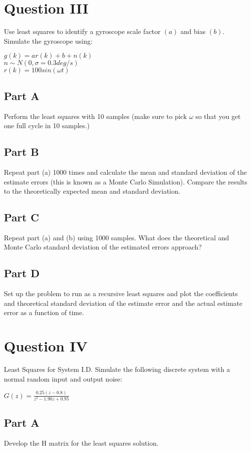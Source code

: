 \documentclass{article}
\begin{document}
\section*{Question III}
Use least squares to identify a gyroscope scale factor $(a)$ and bias $(b)$.  Simulate the gyroscope using:
\begin{center}
    $g(k) = ar(k) + b + n(k)$\\
    $n\sim N(0, \sigma = 0.3 deg/s)$\\
    $r(k) = 100sin(\omega t)$
\end{center}
\subsection*{Part A}
Perform the least squares with 10 samples (make sure to pick $\omega$ so that you get one full cycle in 10 samples.)
\subsection*{Part B}
Repeat part (a) 1000 times and calculate the mean and standard deviation of the estimate errors (this is known as a Monte Carlo Simulation).  
Compare the results to the theoretically expected mean and standard deviation.
\subsection*{Part C}
Repeat part (a) and (b) using 1000 samples.  What does the theoretical and Monte Carlo standard deviation of the estimated errors approach?
\subsection*{Part D}
Set up the problem to run as a recursive least squares and plot the coefficients and theoretical standard deviation of the estimate error and 
the actual estimate error as a function of time.

\section*{Question IV}
Least Squares for System I.D. Simulate the following discrete system with a normal random input and output noise:
\begin{center}
    $G(z) = \frac{0.25(z - 0.8)}{z^2 - 1.90z + 0.95}$
\end{center}
\subsection*{Part A}
Develop the H matrix for the least squares solution.
\end{document}
